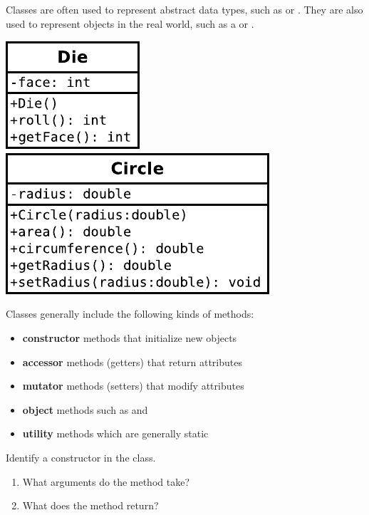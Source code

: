 

Classes are often used to represent abstract data types, such as  or .
They are also used to represent objects in the real world, such as a  or .

\begin{center}
\includegraphics{CS1/Die.pdf}
\includegraphics{CS1/Circle.pdf}
\end{center}

Classes generally include the following kinds of methods:
\begin{itemize}[itemsep=0pt]
\item \textbf{constructor} methods that initialize new objects
\item \textbf{accessor} methods (getters) that return attributes
\item \textbf{mutator} methods (setters) that modify attributes
\item \textbf{object} methods such as  and 
\item \textbf{utility} methods which are generally static
\end{itemize}




\Q Identify a constructor in the  class. 
\begin{enumerate}
\item What arguments do the method take?
\item What does the method return?
\end{enumerate}


